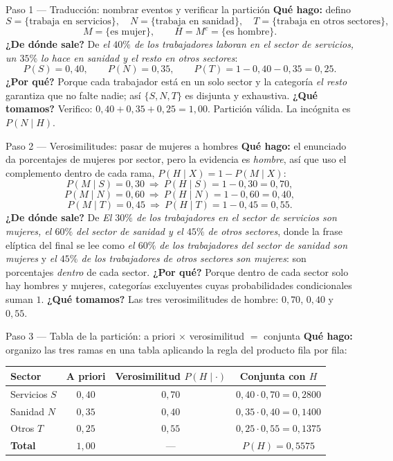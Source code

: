 \documentclass[11pt]{article}
\begin{document}
\begin{sol}

\begin{paso}{Paso 1 --- Traducción: nombrar eventos y verificar la partición}
\textbf{Qué hago:} defino
\[
S=\{\text{trabaja en servicios}\},\quad N=\{\text{trabaja en sanidad}\},\quad T=\{\text{trabaja en otros sectores}\},
\]
\[
M=\{\text{es mujer}\},\qquad H=M^{c}=\{\text{es hombre}\}.
\]
\textbf{¿De dónde sale?} De \emph{el $40\%$ de los trabajadores laboran en el sector de servicios, un $35\%$ lo hace en sanidad y el resto en otros sectores}:
\[
P(S)=0,40,\qquad P(N)=0,35,\qquad P(T)=1-0,40-0,35=0,25.
\]
\textbf{¿Por qué?} Porque cada trabajador está en un solo sector y la categoría \emph{el resto} garantiza que no falte nadie; así $\{S,N,T\}$ es disjunta y exhaustiva.
\textbf{¿Qué tomamos?} Verifico: $0,40+0,35+0,25=1,00$. Partición válida. La incógnita es $P(N\mid H)$.
\end{paso}

\begin{paso}{Paso 2 --- Verosimilitudes: pasar de mujeres a hombres}
\textbf{Qué hago:} el enunciado da porcentajes de mujeres por sector, pero la evidencia es \emph{hombre}, así que uso el complemento dentro de cada rama, $P(H\mid X)=1-P(M\mid X)$:
\[
P(M\mid S)=0,30\ \Rightarrow\ P(H\mid S)=1-0,30=0,70,
\]
\[
P(M\mid N)=0,60\ \Rightarrow\ P(H\mid N)=1-0,60=0,40,
\]
\[
P(M\mid T)=0,45\ \Rightarrow\ P(H\mid T)=1-0,45=0,55.
\]
\textbf{¿De dónde sale?} De \emph{El $30\%$ de los trabajadores en el sector de servicios son mujeres, el $60\%$ del sector de sanidad y el $45\%$ de otros sectores}, donde la frase elíptica del final se lee como \emph{el $60\%$ de los trabajadores del sector de sanidad son mujeres} y \emph{el $45\%$ de los trabajadores de otros sectores son mujeres}: son porcentajes \emph{dentro} de cada sector.
\textbf{¿Por qué?} Porque dentro de cada sector solo hay hombres y mujeres, categorías excluyentes cuyas probabilidades condicionales suman $1$.
\textbf{¿Qué tomamos?} Las tres verosimilitudes de hombre: $0,70$, $0,40$ y $0,55$.
\end{paso}

\begin{paso}{Paso 3 --- Tabla de la partición: a priori $\times$ verosimilitud $=$ conjunta}
\textbf{Qué hago:} organizo las tres ramas en una tabla aplicando la regla del producto fila por fila:

\begin{center}
\begin{tabular}{|l|c|c|c|}
\hline
\textbf{Sector} & \textbf{A priori} & \textbf{Verosimilitud }$P(H\mid \cdot)$ & \textbf{Conjunta con }$H$\\
\hline
Servicios $S$ & $0,40$ & $0,70$ & $0,40\cdot 0,70=0,2800$\\
Sanidad $N$   & $0,35$ & $0,40$ & $0,35\cdot 0,40=0,1400$\\
Otros $T$     & $0,25$ & $0,55$ & $0,25\cdot 0,55=0,1375$\\
\hline
\textbf{Total} & $1,00$ & --- & $P(H)=0,5575$\\
\hline
\end{tabular}
\end{center}


\end{paso}
\end{sol}
\end{document}
